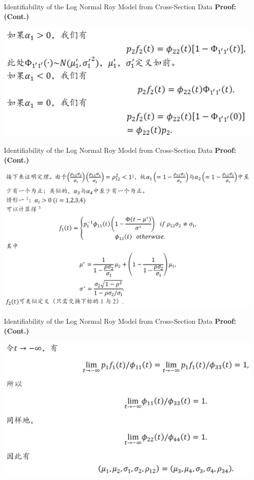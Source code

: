 \documentclass{beamer}
\begin{document}
\begin{frame}{Identifiability of the Log Normal Roy Model from Cross-Section Data}
	\textbf{Proof:(Cont.)}
	
	\includegraphics[scale=0.5]{theorem4_3}
\end{frame}
\begin{frame}{Identifiability of the Log Normal Roy Model from Cross-Section Data}
	\textbf{Proof:(Cont.)}
	
	\includegraphics[scale=0.5]{theorem4_4}
\end{frame}
\begin{frame}{Identifiability of the Log Normal Roy Model from Cross-Section Data}
	\textbf{Proof:(Cont.)}
	
	\includegraphics[scale=0.5]{theorem4_5}
\end{frame}
\end{document}
